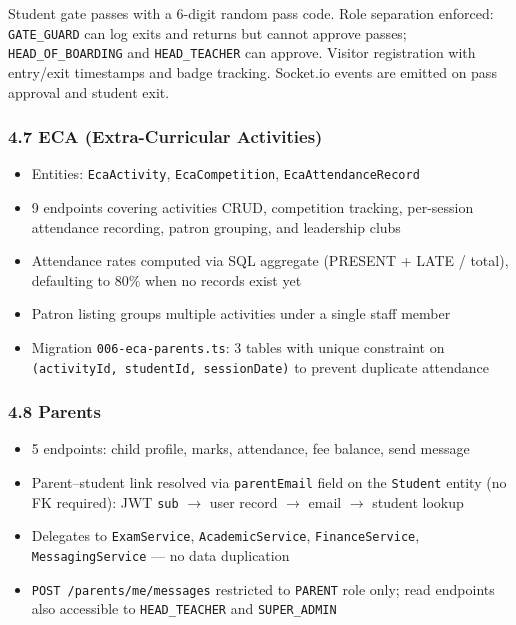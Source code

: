 \documentclass[11pt, a4paper]{article}
\newcommand{\code}[1]{\texttt{\small #1}}
\begin{document}
Student gate passes with a 6-digit random pass code. Role separation enforced:
\code{GATE\_GUARD} can log exits and returns but cannot approve passes;
\code{HEAD\_OF\_BOARDING} and \code{HEAD\_TEACHER} can approve. Visitor
registration with entry/exit timestamps and badge tracking. Socket.io events
are emitted on pass approval and student exit.

\subsubsection*{4.7 ECA (Extra-Curricular Activities)}

\begin{itemize}[leftmargin=1.5em, itemsep=0pt]
  \item Entities: \code{EcaActivity}, \code{EcaCompetition}, \code{EcaAttendanceRecord}
  \item 9 endpoints covering activities CRUD, competition tracking, per-session
    attendance recording, patron grouping, and leadership clubs
  \item Attendance rates computed via SQL aggregate (PRESENT + LATE / total),
    defaulting to 80\% when no records exist yet
  \item Patron listing groups multiple activities under a single staff member
  \item Migration \code{006-eca-parents.ts}: 3 tables with unique constraint on
    \code{(activityId, studentId, sessionDate)} to prevent duplicate attendance
\end{itemize}

\subsubsection*{4.8 Parents}

\begin{itemize}[leftmargin=1.5em, itemsep=0pt]
  \item 5 endpoints: child profile, marks, attendance, fee balance, send message
  \item Parent--student link resolved via \code{parentEmail} field on the
    \code{Student} entity (no FK required): JWT \code{sub} $\to$ user record
    $\to$ email $\to$ student lookup
  \item Delegates to \code{ExamService}, \code{AcademicService},
    \code{FinanceService}, \code{MessagingService} --- no data duplication
  \item \code{POST /parents/me/messages} restricted to \code{PARENT} role only;
    read endpoints also accessible to \code{HEAD\_TEACHER} and \code{SUPER\_ADMIN}
\end{itemize}
\end{document}
